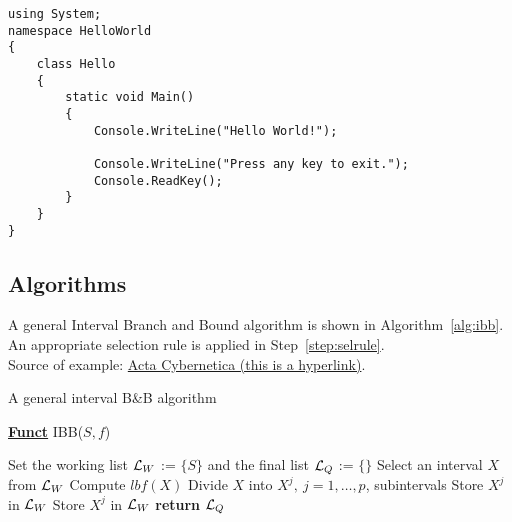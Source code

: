 \begin{lstlisting}[language={[Sharp]C}]
using System;
namespace HelloWorld
{
	class Hello 
	{
		static void Main() 
		{
			Console.WriteLine("Hello World!");
			
			Console.WriteLine("Press any key to exit.");
			Console.ReadKey();
		}
	}
}
\end{lstlisting}

\subsection{Algorithms}

A general Interval Branch and Bound algorithm is shown in Algorithm~\ref{alg:ibb}. An appropriate selection rule is applied in Step~\ref{step:selrule}.\\
Source of example: \href{https://www.inf.u-szeged.hu/actacybernetica/}{Acta Cybernetica (this is a hyperlink)}.

\begin{algorithm}[H]
\caption{A general interval B\&B algorithm} 
\label{alg:ibb} 
\textbf{\underline{Funct}} IBB($S,f$)
\begin{algorithmic}[1] %
\State Set the working list ${\cal L}_W$ := $\{S\}$ and the final list ${\cal L}_Q$ := $\{\}$     
 \label{alg:igoend}
	\State  Select an interval $X$ from ${\cal L}_W$ \label{step:selrule}  
	\State Compute $lbf(X)$ 		  
	 
		\State Divide $X$ into $X^j,\ j=1,\dots, p$, subintervals   
			 
				\State Store $X^j$ in ${\cal L}_W$ 
			\Else
				\State Store $X^j$ in ${\cal L}_W$ 
			\EndIf
		\EndFor  
	\EndIf
\EndWhile
\State \textbf{return} ${\cal L}_Q$
\end{algorithmic}
\end{algorithm}
